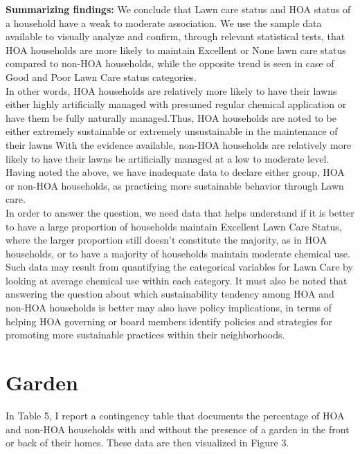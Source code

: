 \documentclass{article}
\begin{document}
\textbf{Summarizing findings:} We conclude that Lawn care status and HOA status of a household have a weak to moderate association. We use the sample data available to visually analyze and confirm, through relevant statistical tests, that HOA households are more likely to maintain Excellent or None lawn care status compared to non-HOA households, while the opposite trend is seen in case of Good and Poor Lawn Care status categories.\\

In other words, HOA households are relatively more likely to have their lawns either highly artificially managed with presumed regular chemical application or have them be fully naturally managed.Thus, HOA households are noted to be either extremely sustainable or extremely unsustainable in the maintenance of their lawns With the evidence available, non-HOA households are relatively more likely to have their lawns be artificially managed at a low to moderate level.\\

Having noted the above, we have inadequate data to declare either group, HOA or non-HOA households, as practicing more sustainable behavior through Lawn care.\\

In order to answer the question, we need data that helps understand if it is better to have a large proportion of households maintain Excellent Lawn Care Status, where the larger proportion still doesn't constitute the majority, as in HOA households, or to have a majority of households maintain moderate chemical use. Such data may result from quantifying the categorical variables for Lawn Care by looking at average chemical use within each category. It must also be noted that answering the question about which sustainability tendency among HOA and non-HOA households is better may also have policy implications, in terms of helping HOA governing or board members identify policies and strategies for promoting more sustainable practices within their neighborhoods.\\

\section*{Garden}

In Table 5, I report a contingency table that documents the percentage of HOA and non-HOA households with and without the presence of a garden in the front or back of their homes. These data are then visualized in Figure 3.
\end{document}

